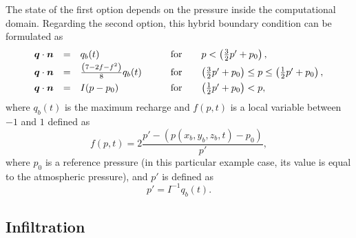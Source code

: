 The state of the first option depends on the pressure inside the computational domain.
Regarding the second option, this hybrid boundary condition \citep[based on][]{hamm2000} can be formulated as
\begin{equation} \label{eq:fifth_bc_richard}
\begin{array} {lllll}
  {\boldsymbol{q}} \cdot \boldsymbol{n} & = & q_{b}(t) & \qquad \text{for} \quad &  p < \left( \frac{3}{2} p' + p_{0} \right), \\[0.5ex]
  {\boldsymbol{q}} \cdot \boldsymbol{n} & = & \frac{\left(  7-2f-f^{2}  \right)}{8} q_{b}(t) 
                    & \qquad \text{for} \quad &  \left( \frac32 p' + p_{0} \right) \leq p \leq \left( \frac12 p' + p_{0} \right), \\[1.0ex]
  {\boldsymbol{q}} \cdot \boldsymbol{n} & = & I (p - p_{0}) &  \qquad \text{for} \quad & \left( \frac{1}{2} p' + p_{0} \right) < p, 
\end{array} 
\end{equation}
where $q_{b}(t)$ is the maximum recharge and $f(p,t)$ is a local variable between $-1$ and $1$ 
defined as 
\begin{equation}
  f(p,t) = 2 \frac{p'- (p(x_{b},y_{b},z_{b},t) - p_{0}) }{p'},
\end{equation}
where $p_{0}$ is a reference pressure (in this particular example case, its value is equal to 
the atmospheric pressure), and $p'$ is defined as 
\begin{equation}
  p' = I^{-1} q_{b}(t).
\end{equation}







%
%



\subsection{Infiltration} \label{sec:infiltration}
%

